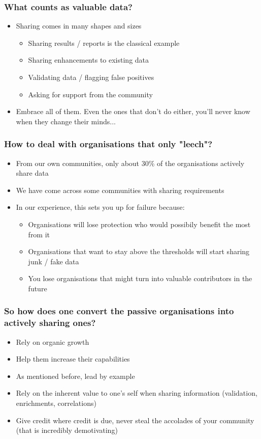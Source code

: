 \begin{frame}
\frametitle{What counts as valuable data?}
\begin{itemize}
	\item Sharing comes in many shapes and sizes
	\begin{itemize}
		\item Sharing results / reports is the classical example
		\item Sharing enhancements to existing data
		\item Validating data / flagging false positives
		\item Asking for support from the community
	\end{itemize}
	\item Embrace all of them. Even the ones that don't do either, you'll never know when they change their minds...
\end{itemize}
\end{frame}

\begin{frame}
\frametitle{How to deal with organisations that only "leech"?}
\begin{itemize}
	\item From our own communities, only about 30\% of the organisations actively share data
	\item We have come across some communities with sharing requirements
	\item In our experience, this sets you up for failure because:
	\begin{itemize}
		\item Organisations will lose protection who would possibily benefit the most from it
		\item Organisations that want to stay above the thresholds will start sharing junk / fake data
		\item You lose organisations that might turn into valuable contributors in the future
	\end{itemize}
\end{itemize}
\end{frame}

\begin{frame}
\frametitle{So how does one convert the passive organisations into actively sharing ones?}
\begin{itemize}
	\item Rely on organic growth
	\item Help them increase their capabilities
	\item As mentioned before, lead by example
	\item Rely on the inherent value to one's self when sharing information (validation, enrichments, correlations)
	\item Give credit where credit is due, never steal the accolades of your community (that is incredibly demotivating)
\end{itemize}
\end{frame}

